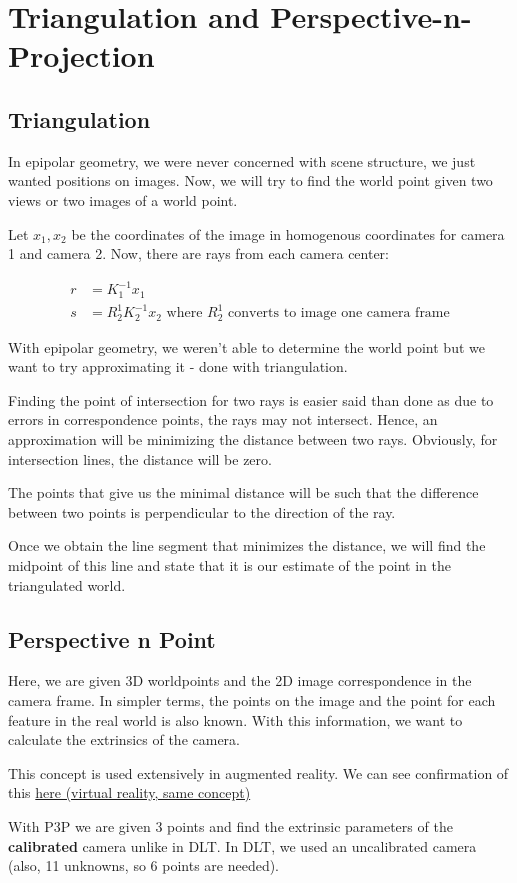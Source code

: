 \chapter{Triangulation and Perspective-n-Projection}

\section{Triangulation}

In epipolar geometry, we were never concerned with scene structure, we just wanted positions on images. Now, we will try to find the world point given two views or two images of a world point.

Let $x_1, x_2$ be the coordinates of the image in homogenous coordinates for camera 1 and camera 2. Now, there are rays from each camera center:

\begin{equation*}
\begin{split}
    r &= K_1^{-1}x_1 \\
    s &= R^1_2K_2^{-1}x_2 \text{ where $R^1_2$ converts to image one camera frame}
\end{split}
\end{equation*}

With epipolar geometry, we weren't able to determine the world point but we want to try approximating it - done with triangulation. 

Finding the point of intersection for two rays is easier said than done as due to errors in correspondence points, the rays may not intersect. Hence, an approximation will be minimizing the distance between two rays. Obviously, for intersection lines, the distance will be zero.

The points that give us the minimal distance will be such that the difference between two points is perpendicular to the direction of the ray.

Once we obtain the line segment that minimizes the distance, we will find the midpoint of this line and state that it is our estimate of the point in the triangulated world. 

\section{Perspective n Point}

Here, we are given 3D worldpoints and the 2D image correspondence in the camera frame. In simpler terms, the points on the image and the point for each feature in the real world is also known. With this information, we want to calculate the extrinsics of the camera. 

This concept is used extensively in augmented reality. We can see confirmation of this  \href{http://vr.cs.uiuc.edu/node292.html}{here (virtual reality, same concept)}

With P3P we are given 3 points and find the extrinsic parameters of the \textbf{calibrated} camera unlike in DLT. In DLT, we used an uncalibrated camera (also, 11 unknowns, so 6 points are needed). 


